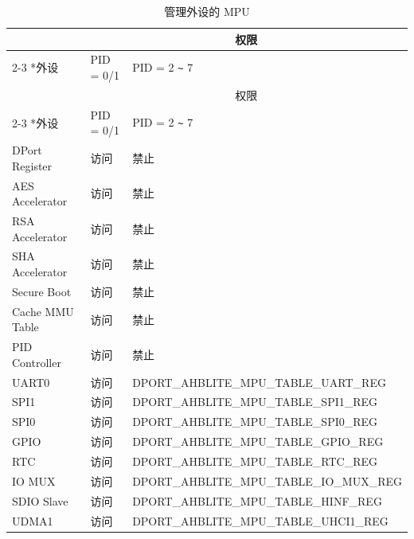 \begin{longtable}[c]{|p{4cm}|p{2cm}|p{9cm}|}
   
    \caption{管理外设的 MPU}
    \label{table:MPU_for_Peripheral}
    \\\hline
    \rowcolor{lightgray}
    & \multicolumn{2}{c|}{权限} \\
    \cline{2-3}
    \rowcolor{lightgray}
    \multirow{-2}*{外设} & PID = 0/1 & PID = 2 \verb+~+ 7 \\
    \hline
    \endfirsthead
  
    \hline
    \rowcolor{lightgray}
    & \multicolumn{2}{c|}{权限} \\
    \cline{2-3}
    \rowcolor{lightgray}
    \multirow{-2}*{外设} & PID = 0/1 & PID = 2 \verb+~+ 7 \\
    \hline
    \endhead

    \endfoot
    
    \hline
    \endlastfoot
    
    DPort Register        & 访问 & 禁止 \\
    \hline
    AES Accelerator       & 访问 & 禁止 \\
    \hline
    RSA Accelerator       & 访问 & 禁止 \\
    \hline
    SHA Accelerator       & 访问 & 禁止 \\
    \hline
    Secure Boot           & 访问 & 禁止 \\
    \hline
    
    
    Cache MMU Table       & 访问 & 禁止 \\
    \hline
    PID Controller        & 访问 & 禁止 \\
    \hline
    UART0                 & 访问 & DPORT\_AHBLITE\_MPU\_TABLE\_UART\_REG \\
    \hline
    SPI1                  & 访问 & DPORT\_AHBLITE\_MPU\_TABLE\_SPI1\_REG \\
    \hline
    SPI0                  & 访问 & DPORT\_AHBLITE\_MPU\_TABLE\_SPI0\_REG \\
    \hline
    GPIO                  & 访问 & DPORT\_AHBLITE\_MPU\_TABLE\_GPIO\_REG \\
    \hline
    
    
    RTC                   & 访问 & DPORT\_AHBLITE\_MPU\_TABLE\_RTC\_REG \\
    \hline
    IO MUX                & 访问 & DPORT\_AHBLITE\_MPU\_TABLE\_IO\_MUX\_REG \\
    \hline
    
    
    SDIO Slave            & 访问 & DPORT\_AHBLITE\_MPU\_TABLE\_HINF\_REG \\
    \hline
    UDMA1                 & 访问 & DPORT\_AHBLITE\_MPU\_TABLE\_UHCI1\_REG \\
    \hline
    

\end{longtable}
